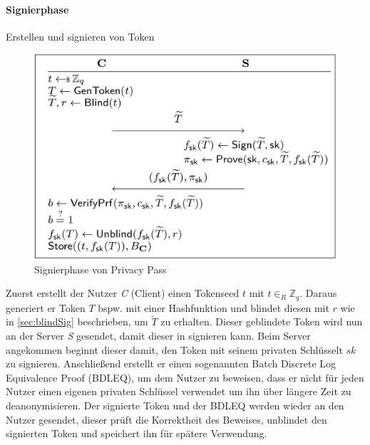 \documentclass[11pt,a4paper]{scrreprt}
\begin{document}
\paragraph{Signierphase} Erstellen und signieren von Token

\begin{figure}[H]
    \centering
    \includegraphics[width=0.5\linewidth]{pp_signphase.png}
    \caption{Signierphase von Privacy Pass \cite{pp-davidson2018privacy}}
    \label{fig:pp-signingphase}
\end{figure}
Zuerst erstellt der Nutzer \textit{C} (Client) einen Tokenseed $t$ mit $t {\in}_R \mathbb{Z}_q $. Daraus generiert er Token $T$ bspw. mit einer Hashfunktion und blindet diesen mit $r$ wie in \ref{sec:blindSig} beschrieben, um $\widetilde{T}$ zu erhalten. Dieser geblindete Token wird nun an der Server \textit{S} gesendet, damit dieser in signieren kann. Beim Server angekommen beginnt dieser damit, den Token mit seinem privaten Schlüsselt $sk$ zu signieren. Anschließend erstellt er einen sogenannten Batch Discrete Log Equivalence Proof (BDLEQ), um dem Nutzer zu beweisen, dass er nicht für jeden Nutzer einen eigenen privaten Schlüssel verwendet um ihn über längere Zeit zu deanonymisieren. Der signierte Token und der BDLEQ werden wieder an den Nutzer gesendet, dieser prüft die Korrektheit des Beweises, unblindet den signierten Token und speichert ihn für spätere Verwendung. 
\end{document}
